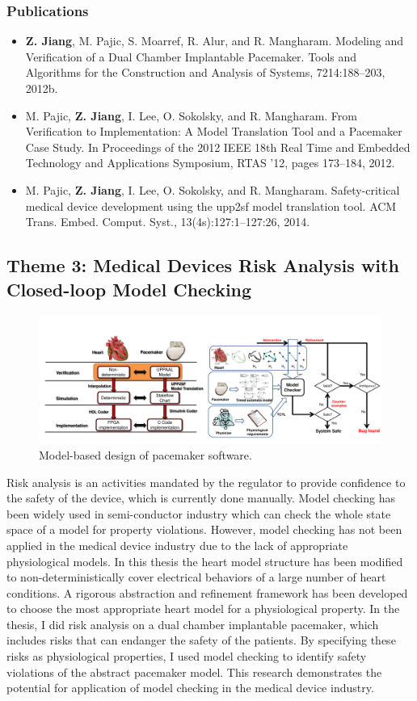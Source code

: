 \documentclass[a4paper]{article}
\begin{document}
\subsubsection{Publications}
\begin{itemize}
\item \textbf{Z. Jiang}, M. Pajic, S. Moarref, R. Alur, and R. Mangharam. Modeling and Verification
of a Dual Chamber Implantable Pacemaker. Tools and Algorithms for the
Construction and Analysis of Systems, 7214:188–203, 2012b.
\item M. Pajic, \textbf{Z. Jiang}, I. Lee, O. Sokolsky, and R. Mangharam. From Verification to
Implementation: A Model Translation Tool and a Pacemaker Case Study. In Proceedings
of the 2012 IEEE 18th Real Time and Embedded Technology and Applications
Symposium, RTAS ’12, pages 173–184, 2012.
\item M. Pajic, \textbf{Z. Jiang}, I. Lee, O. Sokolsky, and R. Mangharam. Safety-critical medical
device development using the upp2sf model translation tool. ACM Trans. Embed.
Comput. Syst., 13(4s):127:1–127:26, 2014.
\end{itemize}

\newpage
\subsection{Theme 3: Medical Devices Risk Analysis with Closed-loop Model Checking}
\begin{figure}[t]
	\centering
	\includegraphics[scale=0.32]{figs/mb_mc.pdf}
	\caption{\small Model-based design of pacemaker software.}
	\label{fig:mb_mc}
\end{figure}
Risk analysis is an activities mandated by the regulator to provide confidence to the safety of the device, which is currently done manually.
Model checking has been widely used in semi-conductor industry which can check the whole state space of a model for property violations.
However, model checking has not been applied in the medical device industry due to the lack of appropriate physiological models.
In this thesis the heart model structure has been modified to non-deterministically cover electrical behaviors of a large number of heart conditions.
A rigorous abstraction and refinement framework has been developed to choose the most appropriate heart model for a physiological property.
In the thesis, I did risk analysis on a dual chamber implantable pacemaker, which includes risks that can endanger the safety of the patients.
By specifying these risks as physiological properties, I used model checking to identify safety violations of the abstract pacemaker model.
This research demonstrates the potential for application of model checking in the medical device industry.
\end{document}
